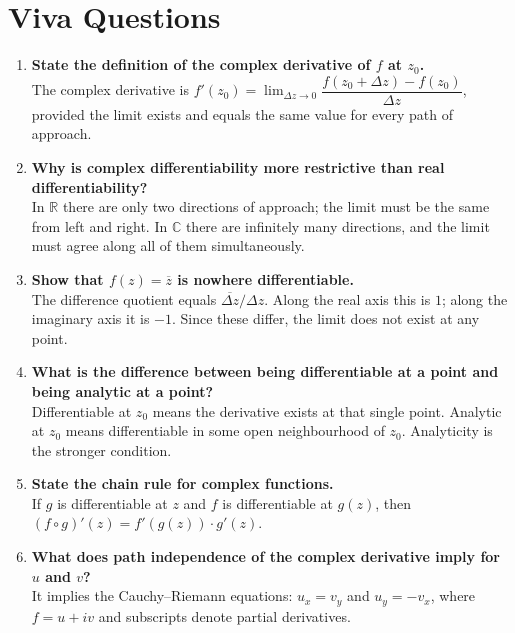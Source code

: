 \documentclass[12pt,a4paper]{article}
\begin{document}
\section{Viva Questions}

\begin{enumerate}[label=\textbf{Q\arabic*.}, leftmargin=2.5em]

\item \textbf{State the definition of the complex derivative of $f$ at $z_0$.}\\
The complex derivative is
$f'(z_0) = \lim_{\Delta z\to 0}\dfrac{f(z_0+\Delta z)-f(z_0)}{\Delta z}$,
provided the limit exists and equals the same value for every path of approach.

\item \textbf{Why is complex differentiability more restrictive than real differentiability?}\\
In $\mathbb{R}$ there are only two directions of approach; the limit must be the same
from left and right. In $\mathbb{C}$ there are infinitely many directions, and the limit
must agree along all of them simultaneously.

\item \textbf{Show that $f(z) = \overline{z}$ is nowhere differentiable.}\\
The difference quotient equals $\overline{\Delta z}/\Delta z$. Along the real axis this
is $1$; along the imaginary axis it is $-1$. Since these differ, the limit does not
exist at any point.

\item \textbf{What is the difference between being differentiable at a point and being analytic at a point?}\\
Differentiable at $z_0$ means the derivative exists at that single point.
Analytic at $z_0$ means differentiable in some open neighbourhood of $z_0$.
Analyticity is the stronger condition.

\item \textbf{State the chain rule for complex functions.}\\
If $g$ is differentiable at $z$ and $f$ is differentiable at $g(z)$, then
$(f \circ g)'(z) = f'(g(z))\cdot g'(z)$.

\item \textbf{What does path independence of the complex derivative imply for $u$ and $v$?}\\
It implies the Cauchy--Riemann equations:
$u_x = v_y$ and $u_y = -v_x$,
where $f = u + iv$ and subscripts denote partial derivatives.


\end{enumerate}
\end{document}
